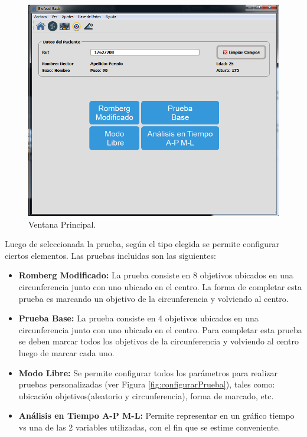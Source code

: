 \documentclass[12pt,a4paper]{article}
\begin{document}
\begin{figure}[H]
	\centering
	\includegraphics[scale=0.6]{images/mainwindow}
	\caption{Ventana Principal.}
	\label{fig:mainwindow}
\end{figure}

Luego de seleccionada la prueba, según el tipo elegida se permite configurar ciertos elementos.
Las pruebas incluidas son las siguientes:
\begin{itemize}
	\item \textbf{Romberg Modificado:} La prueba consiste en 8 objetivos ubicados en una circunferencia junto con uno ubicado en el centro.
	La forma de completar esta prueba es marcando un objetivo de la circunferencia y volviendo al centro.
	\item \textbf{Prueba Base:} La prueba consiste en 4 objetivos ubicados en una circunferencia junto con uno ubicado en el centro.
	Para completar esta prueba se deben marcar todos los objetivos de la circunferencia y volviendo al centro luego de marcar cada uno.
	\item \textbf{Modo Libre:} Se permite configurar todos los parámetros para realizar pruebas personalizadas (ver Figura \ref{fig:configurarPrueba}), tales como: ubicación objetivos(aleatorio y circunferencia), forma de marcado, etc.
	\item \textbf{Análisis en Tiempo A-P M-L:} Permite representar en un gráfico tiempo vs una de las 2 variables utilizadas, con el fin que se estime conveniente.
\end{itemize}
\end{document}
